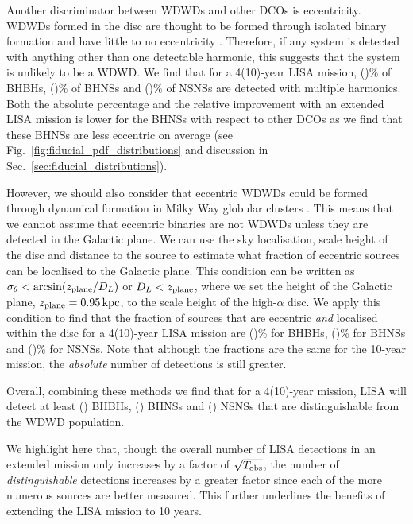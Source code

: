 Another discriminator between WDWDs and other DCOs is eccentricity. WDWDs formed in the disc are thought to be formed through isolated binary formation and have little to no eccentricity \citep[e.g.][]{Nelemans+2001}. Therefore, if any system is detected with anything other than one detectable harmonic, this suggests that the system is unlikely to be a WDWD. We find that for a 4(10)-year LISA mission, \BHBHMultipleHarmonicsFourPerc{}(\BHBHMultipleHarmonicsTenPerc{})\% of BHBHs, \BHNSMultipleHarmonicsFourPerc{}(\BHNSMultipleHarmonicsTenPerc{})\% of BHNSs and \NSNSMultipleHarmonicsFourPerc(\NSNSMultipleHarmonicsTenPerc{})\% of NSNSs are detected with multiple harmonics. Both the absolute percentage and the relative improvement with an extended LISA mission is lower for the BHNSs with respect to other DCOs as we find that these BHNSs are less eccentric on average (see Fig.~\ref{fig:fiducial_pdf_distributions} and discussion in Sec.~\ref{sec:fiducial_distributions}).

However, we should also consider that eccentric WDWDs could be formed through dynamical formation in Milky Way globular clusters \citep[e.g.][]{Willems+2007, Kremer+2018}. This means that we cannot assume that eccentric binaries are not WDWDs unless they are detected in the Galactic plane. We can use the sky localisation, scale height of the disc and distance to the source to estimate what fraction of eccentric sources can be localised to the Galactic plane. This condition can be written as $\sigma_\theta < \arcsin(z_{\rm plane} / D_L)$ or $D_L < z_{\rm plane}$, where we set the height of the Galactic plane, $z_{\rm plane}=0.95 \unit{kpc}$, to the scale height of the high-$\alpha$ disc. We apply this condition to find that the fraction of sources that are eccentric \textit{and} localised within the disc for a 4(10)-year LISA mission are \BHBHEccInDiscFourPerc{}(\BHBHEccInDiscTenPerc{})\% for BHBHs, \BHNSEccInDiscFourPerc{}(\BHNSEccInDiscTenPerc{})\% for BHNSs and \NSNSEccInDiscFourPerc{}(\NSNSEccInDiscTenPerc{})\% for NSNSs. Note that although the fractions are the same for the 10-year mission, the \textit{absolute} number of detections is still greater.

Overall, combining these methods we find that for a 4(10)-year mission, LISA will detect at least \BHBHNotWDWDFour{}(\BHBHNotWDWDTen{}) BHBHs, \BHNSNotWDWDFour{}(\BHNSNotWDWDTen{}) BHNSs and \NSNSNotWDWDFour{}(\NSNSNotWDWDTen{}) NSNSs that are distinguishable from the WDWD population.

We highlight here that, though the overall number of LISA detections in an extended mission only increases by a factor of $\sqrt{T_{\rm obs}}$, the number of \textit{distinguishable} detections increases by a greater factor since each of the more numerous sources are better measured. This further underlines the benefits of extending the LISA mission to 10 years.

